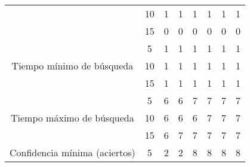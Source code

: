 \begin{sidewaystable}
\begin{tabular}{@{}ccc|rrrrrr@{}}
\multicolumn{2}{c}{}                                               & 10       & 1                            & 1                            & 1                             & 1                             & 1                             & 1                             \\
\multicolumn{2}{c}{}                                               & 15       & 0                            & 0                            & 0                             & 0                             & 0                             & 0                             \\
\midrule\multicolumn{2}{c}{\multirow{3}{*}{Tiempo mínimo de búsqueda}}     & 5        & 1                            & 1                            & 1                             & 1                             & 1                             & 1                             \\
\multicolumn{2}{c}{}                                               & 10       & 1                            & 1                            & 1                             & 1                             & 1                             & 1                             \\
\multicolumn{2}{c}{}                                               & 15       & 1                            & 1                            & 1                             & 1                             & 1                             & 1                             \\
\midrule
\multicolumn{2}{c}{\multirow{3}{*}{Tiempo máximo de búsqueda}}     & 5        & 6                            & 6                            & 7                             & 7                             & 7                             & 7                             \\
\multicolumn{2}{c}{}                                               & 10       & 6                            & 6                            & 6                             & 7                             & 7                             & 7                             \\
\multicolumn{2}{c}{}                                               & 15       & 6                            & 7                            & 7                             & 7                             & 7                             & 7                             \\
\midrule
\multicolumn{2}{c}{\multirow{3}{*}{Confidencia mínima (aciertos)}} & 5        & 2                            & 2                            & 8                             & 8                             & 8                             & 8                             \\

\end{tabular}
\end{sidewaystable}
